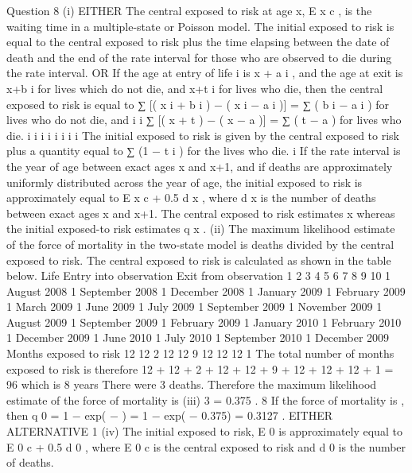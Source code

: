\documentclass[a4paper,12pt]{article}
\begin{document}
\begin{enumerate}
Question 8
(i)
EITHER
The central exposed to risk at age x, E x c , is the waiting time in a multiple-state or
Poisson model.
The initial exposed to risk is equal to the central exposed to risk plus the time elapsing
between the date of death and the end of the rate interval for those who are observed
to die during the rate interval.
OR
If the age at entry of life i is x + a i , and the age at exit is x+b i for lives which do not
die, and x+t i for lives who die, then the central exposed to risk is equal to
∑ [( x i + b i ) − ( x i − a i )] = ∑ ( b i − a i ) for lives who do not die, and
i
i
∑ [( x + t ) − ( x − a )] = ∑ ( t − a ) for lives who die.
i
i
i
i
i
i
i
i
The initial exposed to risk is given by the central exposed to risk plus a quantity equal
to ∑ (1 − t i ) for the lives who die.
i
If the rate interval is the year of age between exact ages x and x+1, and if deaths are
approximately uniformly distributed across the year of age, the initial exposed to risk
is approximately equal to E x c + 0.5 d x , where d x is the number of deaths between exact
ages x and x+1.
The central exposed to risk estimates \mu x whereas the initial exposed-to risk estimates
q x .
(ii)
The maximum likelihood estimate of the force of mortality in the two-state model is
deaths divided by the central exposed to risk.
The central exposed to risk is calculated as shown in the table below.
Life Entry into
observation Exit from
observation
1
2
3
4
5
6
7
8
9
10 1 August 2008
1 September 2008
1 December 2008
1 January 2009
1 February 2009
1 March 2009
1 June 2009
1 July 2009
1 September 2009
1 November 2009 1 August 2009
1 September 2009
1 February 2009
1 January 2010
1 February 2010
1 December 2009
1 June 2010
1 July 2010
1 September 2010
1 December 2009
Months
exposed
to risk
12
12
2
12
12
9
12
12
12
1
The total number of months exposed to risk is therefore
12 + 12 + 2 + 12 + 12 + 9 + 12 + 12 + 12 + 1 = 96
which is 8 years
There were 3 deaths.
Therefore the maximum likelihood estimate of the force of mortality is
(iii)
3
= 0.375 .
8
If the force of mortality is  , then
q 0 = 1 − exp( − ) = 1 − exp( − 0.375) = 0.3127 .
EITHER ALTERNATIVE 1
(iv)
The initial exposed to risk, E 0 is approximately equal to E 0 c + 0.5 d 0 , where E 0 c is the
central exposed to risk and d 0 is the number of deaths.

\end{enumerate}
\end{document}
